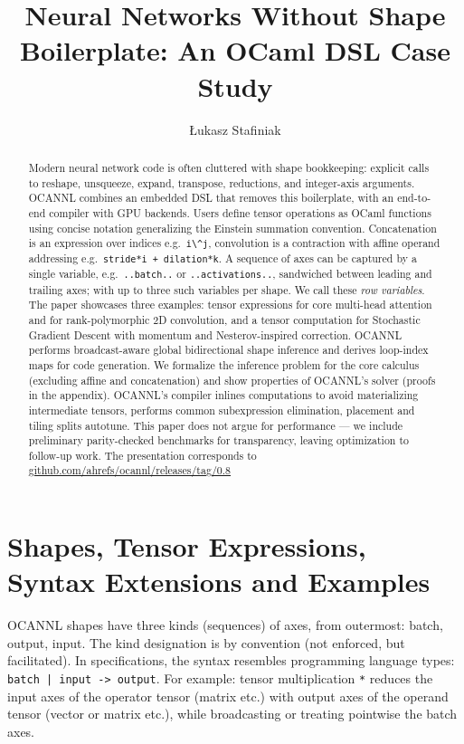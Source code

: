 \documentclass[
  10pt,
  letterpaper,
]{article}
\title{Neural Networks Without Shape Boilerplate: An OCaml DSL Case
Study}
\author{Łukasz Stafiniak}
\affil{Independent researcher, sponsored by Ahrefs}
\date{}
\newcommand{\passthrough}[1]{#1}
\begin{document}
\maketitle
\begin{abstract}
Modern neural network code is often cluttered with shape bookkeeping:
explicit calls to reshape, unsqueeze, expand, transpose, reductions, and
integer-axis arguments. OCANNL combines an embedded DSL that removes
this boilerplate, with an end-to-end compiler with GPU backends. Users
define tensor operations as OCaml functions using concise notation
generalizing the Einstein summation convention. Concatenation is an
expression over indices e.g.~\passthrough{\lstinline!i\^j!}, convolution
is a contraction with affine operand addressing
e.g.~\passthrough{\lstinline!stride*i + dilation*k!}. A sequence of axes
can be captured by a single variable,
e.g.~\passthrough{\lstinline!..batch..!} or
\passthrough{\lstinline!..activations..!}, sandwiched between leading
and trailing axes; with up to three such variables per shape. We call
these \emph{row variables}. The paper showcases three examples: tensor
expressions for core multi-head attention and for rank-polymorphic 2D
convolution, and a tensor computation for Stochastic Gradient Descent
with momentum and Nesterov-inspired correction. OCANNL performs
broadcast-aware global bidirectional shape inference and derives
loop-index maps for code generation. We formalize the inference problem
for the core calculus (excluding affine and concatenation) and show
properties of OCANNL's solver (proofs in the appendix). OCANNL's
compiler inlines computations to avoid materializing intermediate
tensors, performs common subexpression elimination, placement and tiling
splits autotune. This paper does not argue for performance --- we
include preliminary parity-checked benchmarks for transparency, leaving
optimization to follow-up work. The presentation corresponds to
\href{https://github.com/ahrefs/ocannl/releases/tag/0.8}{github.com/ahrefs/ocannl/releases/tag/0.8}
\end{abstract}

\section{Shapes, Tensor Expressions, Syntax Extensions and
Examples}\label{shapes-tensor-expressions-syntax-extensions-and-examples}

OCANNL shapes have three kinds (sequences) of axes, from outermost:
batch, output, input. The kind designation is by convention (not
enforced, but facilitated). In specifications, the syntax resembles
programming language types:
\passthrough{\lstinline!batch | input -> output!}. For example: tensor
multiplication \passthrough{\lstinline!*!} reduces the input axes of the
operator tensor (matrix etc.) with output axes of the operand tensor
(vector or matrix etc.), while broadcasting or treating pointwise the
batch axes.
\end{document}
